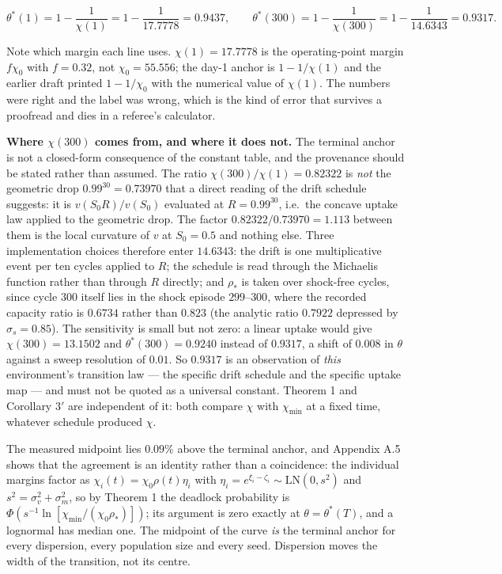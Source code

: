 \documentclass[11pt,a4paper]{article}
\begin{document}
\[
\theta^\ast(1)=1-\frac{1}{\chi(1)}=1-\frac{1}{17.7778}=0.9437,
\qquad
\theta^\ast(300)=1-\frac{1}{\chi(300)}=1-\frac{1}{14.6343}=0.9317 .
\]

Note which margin each line uses. \(\chi(1)=17.7778\) is the operating-point margin
\(f\chi_0\) with \(f=0.32\), not \(\chi_0=55.556\); the day-1 anchor is \(1-1/\chi(1)\) and
the earlier draft printed \(1-1/\chi_0\) with the numerical value of \(\chi(1)\). The
numbers were right and the label was wrong, which is the kind of error that survives
a proofread and dies in a referee's calculator.

\textbf{Where \(\chi(300)\) comes from, and where it does not.} The terminal anchor is not
a closed-form consequence of the constant table, and the provenance should be
stated rather than assumed. The ratio \(\chi(300)/\chi(1)=0.82322\) is \emph{not} the
geometric drop \(0.99^{30}=0.73970\) that a direct reading of the drift schedule
suggests: it is \(v(S_0R)/v(S_0)\) evaluated at \(R=0.99^{30}\), i.e.~the concave
uptake law applied to the geometric drop. The factor \(0.82322/0.73970=1.113\)
between them is the local curvature of \(v\) at \(S_0=0.5\) and nothing else. Three
implementation choices therefore enter \(14.6343\): the drift is one multiplicative
event per ten cycles applied to \(R\); the schedule is read through the Michaelis
function rather than through \(R\) directly; and \(\rho_\ast\) is taken over shock-free
cycles, since cycle \(300\) itself lies in the shock episode \(299\)--\(300\), where the
recorded capacity ratio is \(0.6734\) rather than \(0.823\) (the analytic ratio
\(0.7922\) depressed by \(\sigma_s=0.85\)). The sensitivity is small but not zero: a
linear uptake would give \(\chi(300)=13.1502\) and
\(\theta^\ast(300)=0.9240\) instead of \(0.9317\), a shift of \(0.008\) in \(\theta\)
against a sweep resolution of \(0.01\). So \(0.9317\) is an observation of \emph{this}
environment's transition law --- the specific drift schedule and the specific uptake
map --- and must not be quoted as a universal constant. Theorem 1 and Corollary
3\('\) are independent of it: both compare \(\chi\) with \(\chi_{\min}\) at a fixed
time, whatever schedule produced \(\chi\).

The measured midpoint lies \(0.09\%\) above the terminal anchor, and Appendix A.5
shows that the agreement is an identity rather than a coincidence: the individual
margins factor as \(\chi_i(t)=\chi_0\rho(t)\eta_i\) with
\(\eta_i=e^{\xi_i-\zeta_i}\sim\mathrm{LN}(0,s^2)\) and \(s^2=\sigma_v^2+\sigma_m^2\),
so by Theorem 1 the deadlock probability is
\(\Phi\!\left(s^{-1}\ln[\chi_{\min}/(\chi_0\rho_\ast)]\right)\); its argument is zero
exactly at \(\theta=\theta^\ast(T)\), and a lognormal has median one. The midpoint of
the curve \emph{is} the terminal anchor for every dispersion, every population size and
every seed. Dispersion moves the width of the transition, not its centre.
\end{document}
